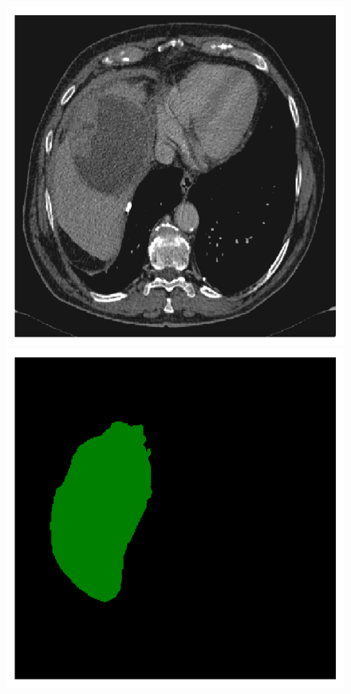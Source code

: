 \begin{figure}[!ht]
\begin{minipage}{4cm}
	\end{minipage} \\
	\begin{minipage}{4cm}
		\includegraphics[width=\linewidth]{images/ResizeLiverVE_Raw_Pat1_1}
	\end{minipage} \hspace{-0.3cm}
	\begin{minipage}{4cm}
		\includegraphics[width=\linewidth]{images/ResizeLiverVE_GT_Pat1_1}

\end{minipage}
\end{figure}
